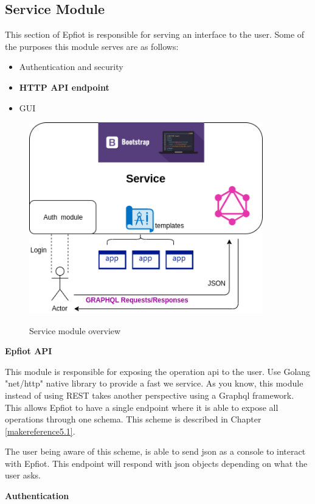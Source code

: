 \newpage
\subsection{Service Module}

This section of Epfiot is responsible for serving an interface to the user.
Some of the purposes this module serves are as follows:
\begin{itemize}
    \item Authentication and security
    \item \textbf{ HTTP API endpoint}
    \item GUI
\end{itemize}

\begin{figure}[h!]%
\centering
    \includegraphics[width=4.0in]{figures/Service.png}
~\caption{Service module overview}
\label{figure4.3}
\end{figure}

\textbf{Epfiot API}

This module is responsible for exposing the operation api to the user.
Use Golang "net/http" native library to provide a fast we service. As you know, this module instead of using REST takes another perspective using a Graphql framework. This allows Epfiot to have a single endpoint where it is able to expose all operations through one schema. This scheme is described in Chapter \ref{makereference5.1}.

The user being aware of this scheme, is able to send json as a console to interact with Epfiot. This endpoint will respond with json objects depending on what the user asks.
\newpage

\textbf{Authentication}

